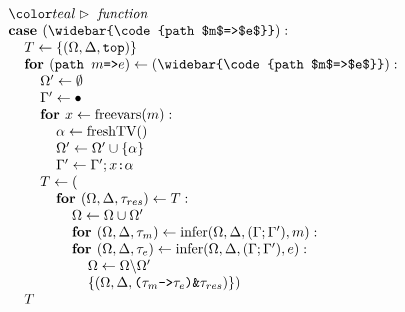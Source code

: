 \documentclass[acmsmall]{acmart}
\begin{document}
\begin{figure*}[h]
\[\begin{array}[t]{@{} l}
    \\

    \I \C{function}
    \\
    \I \B{case } (\widebar{\code{path $m$=>$e$}})  :  
    \\
    \I\I T \leftarrow \{(\Omega, \Delta, \code{top})\}
    \\
    \I\I \B{for } (\code{path $m$=>$e$}) \leftarrow (\widebar{\code{path $m$=>$e$}}): 
    \\
    \I\I\I \Omega' \leftarrow \emptyset
    \\
    \I\I\I \Gamma' \leftarrow \bullet
    \\
    \I\I\I \B{for } x \leftarrow \F{freevars}(m):
    \\
    \I\I\I\I \alpha \leftarrow \F{freshTV}() 
    \\
    \I\I\I\I \Omega' \leftarrow \Omega' \cup \{\alpha\} 
    \\
    \I\I\I\I \Gamma' \leftarrow \Gamma';\code{$x$:$\alpha$}
    \\
    \I\I\I T \leftarrow (
    \\
    \I\I\I\I \B{for } (\Omega, \Delta, \tau_{res}) \leftarrow T: 
    \\
    \I\I\I\I\I \Omega \leftarrow \Omega \cup \Omega'
    \\
    \I\I\I\I\I \B{for } (\Omega, \Delta, \tau_{m}) \leftarrow \F{infer}(\Omega, \Delta, (\Gamma;\Gamma'), m): 
    \\
    \I\I\I\I\I \B{for } (\Omega, \Delta, \tau_{e}) \leftarrow \F{infer}(\Omega, \Delta, (\Gamma;\Gamma'), e): 
    \\
    \I\I\I\I\I\I \Omega \leftarrow \Omega \backslash \Omega'
    \\
    \I\I\I\I\I\I \{(\Omega, \Delta, \code{($\tau_{m}$->$\tau_{e}$)\&$\tau_{res}$})\})
    \\
    \I\I T

    \\


\end{array}\]
\end{figure*}
\end{document}
